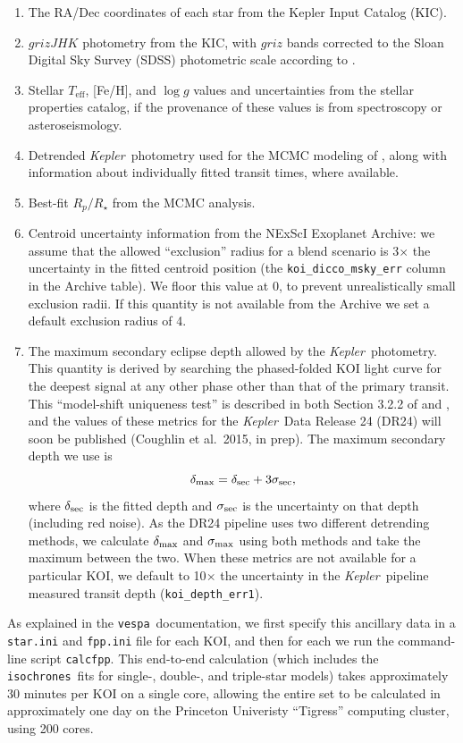 \documentclass{emulateapj}
\newcommand{\eqlabel}[1]{\label{eq:#1}}
\newcommand{\kepler}{\textit{Kepler}}
\newcommand{\vespa}{\texttt{vespa}}
\newcommand{\isochrones}{\texttt{isochrones}}
\begin{document}
\begin{enumerate}
\item The RA/Dec coordinates of each star from the Kepler Input
  Catalog (KIC).
\item $grizJHK$ photometry from the KIC, with $griz$ bands corrected
  to the Sloan Digital Sky Survey (SDSS) photometric scale according
  to \citet{Pinsonneault:2012}.
\item Stellar $T_\mathrm{eff}$, [Fe/H], and $\log g$ values and
  uncertainties from the \citet{Huber:2014} stellar properties
  catalog, if the provenance of these values is from spectroscopy or
  asteroseismology.
\item Detrended \kepler\ photometry used for the MCMC modeling of
  \citet{Rowe:2015}, along with information about individually fitted
  transit times, where available.  
\item Best-fit $R_p/R_\star$ from the \citet{Rowe:2015} MCMC analysis.
\item Centroid uncertainty information from the NExScI Exoplanet
  Archive: we assume that the allowed ``exclusion'' radius for a blend
  scenario is 3$\times$ the uncertainty in the fitted centroid
  position (the \verb|koi_dicco_msky_err| column in the Archive
  table).  We floor this value at 0, to prevent unrealistically
  small exclusion radii.  If this quantity is not available from the
  Archive we set a default exclusion radius of 4\arcsec.
\item The maximum secondary eclipse depth allowed by the
  \kepler\ photometry.  This quantity is derived by searching the
  phased-folded KOI light curve for the deepest signal at any other
  phase other than that of the primary transit.  This ``model-shift
  uniqueness test'' is described in both Section 3.2.2 of
  \citet{Rowe:2015} and \citet{Coughlin:KSCI}, and the values of these
  metrics for the \kepler\ Data Release 24 (DR24) will soon be
  published (Coughlin et al.~2015, in prep).  The maximum secondary
  depth we use is
\begin{equation}
\eqlabel{secthresh}
\delta_{\rm max} = \delta_{\rm sec}  + 3 \sigma_{\rm sec},
\end{equation}
where $\delta_{\rm sec}$ is the fitted depth and $\sigma_{\rm sec}$ is
the uncertainty on that depth (including red noise).  As the DR24
pipeline uses two different detrending methods, we calculate
$\delta_{\rm max}$ and $\sigma_{\rm max}$ using both methods and take
the maximum between the two.  When these metrics are not available for
a particular KOI, we default to 10$\times$ the uncertainty in the
\kepler\ pipeline measured transit depth (\verb|koi_depth_err1|).
  
\end{enumerate}
As explained in the \vespa\ documentation, we first specify this
ancillary data in a \verb|star.ini| and \verb|fpp.ini| file for each
KOI, and then for each we run the command-line script \verb|calcfpp|.
This end-to-end calculation (which includes the \isochrones\ fits for
single-, double-, and triple-star models) takes approximately 30
minutes per KOI on a single core, allowing the entire set to be
calculated in approximately one day on the Princeton Univeristy
``Tigress'' computing cluster, using 200 cores.
\end{document}
